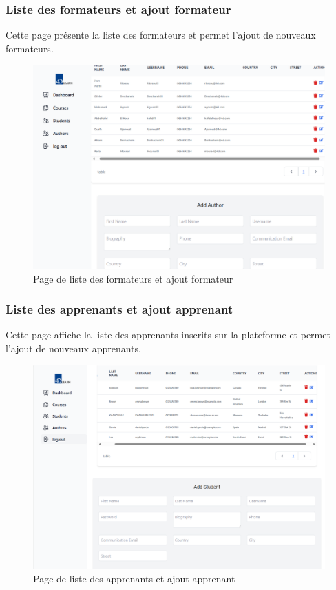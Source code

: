 \subsubsection{Liste des formateurs et ajout formateur }

Cette page présente la liste des formateurs et permet l'ajout de nouveaux formateurs.

\begin{figure}[H]
    \centering
    \includegraphics[width=19cm]{Figures/addAuthor.png}
    \caption{ Page de liste des formateurs et ajout formateur }
\end{figure}

\subsubsection{Liste des apprenants et ajout apprenant}

Cette page affiche la liste des apprenants inscrits sur la plateforme et permet l'ajout de nouveaux apprenants.

\begin{figure}[H]
    \centering
    \includegraphics[width=19cm]{Figures/addStudent.png}
    \caption{ Page de liste des apprenants et ajout apprenant}
\end{figure}
